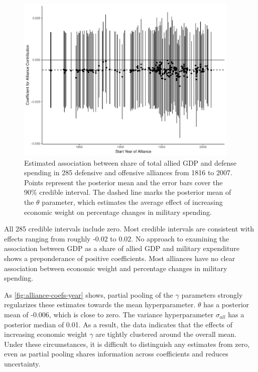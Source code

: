\documentclass[12pt]{article}
\begin{document}
\begin{figure}[htbp]
	\centering
		\includegraphics[width=0.95\textwidth]{alliance-coefs-year.pdf}
	\caption{Estimated association between share of total allied GDP and defense spending in 285 defensive and offensive alliances from 1816 to 2007. Points represent the posterior mean and the error bars cover the 90\% credible interval. The dashed line marks the posterior mean of the $\theta$ parameter, which estimates the average effect of increasing economic weight on percentage changes in military spending.}
	\label{fig:alliance-coefs-year}
\end{figure}


All 285 credible intervals include zero. 
Most credible intervals are consistent with effects ranging from roughly -0.02 to 0.02. 
No approach to examining the association between GDP as a share of allied GDP and military expenditure shows a preponderance of positive coefficients. 
Most alliances have no clear association between economic weight and percentage changes in military spending.


As \autoref{fig:alliance-coefs-year} shows, partial pooling of the $\gamma$ parameters strongly regularizes these estimates towards the mean hyperparameter. 
$\theta$ has a posterior mean of -0.006, which is close to zero. 
The variance hyperparameter $\sigma_{all}$ has a posterior median of 0.01. 
As a result, the data indicates that the effects of increasing economic weight $\gamma$ are tightly clustered around the overall mean. 
Under these circumstances, it is difficult to distinguish any estimates from zero, even as partial pooling shares information across coefficients and reduces uncertainty. 
\end{document}
